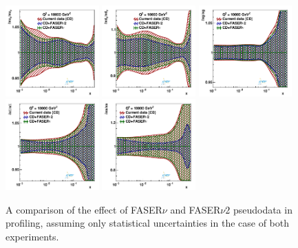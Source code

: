\begin{figure}[t]
\centering
\includegraphics[width=0.32\textwidth]{plots/proton_fasernu2/experiment_comparison/statOnly_FASERv_q2_10000_pdf_uv_ratio.pdf}
\includegraphics[width=0.32\textwidth]{plots/proton_fasernu2/experiment_comparison/statOnly_FASERv_q2_10000_pdf_dv_ratio.pdf}
\includegraphics[width=0.32\textwidth]{plots/proton_fasernu2/experiment_comparison/statOnly_FASERv_q2_10000_pdf_g_ratio.pdf}\\
\includegraphics[width=0.32\textwidth]{plots/proton_fasernu2/experiment_comparison/statOnly_FASERv_q2_10000_pdf_Sea_ratio.pdf}
\includegraphics[width=0.32\textwidth]{plots/proton_fasernu2/experiment_comparison/statOnly_FASERv_q2_10000_pdf_s_ratio.pdf}
\caption{
A comparison of the effect of FASER$\nu$ and FASER$\nu2$ pseudodata in profiling, 
assuming only statistical uncertainties in the case of both experiments.
}
\label{fig:profiling_experiment_comparison}
\end{figure}


